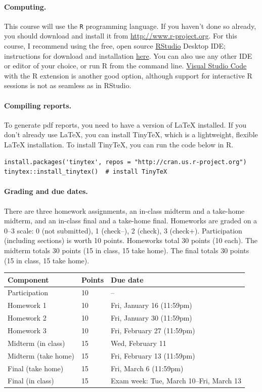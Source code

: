 \documentclass[letterpaper, 12pt, parskip=full,DIV=10]{scrartcl}
\begin{document}
\paragraph{Computing.} This course will use the \texttt{R} programming language. 
If you haven't done so already, you should download and install it from \url{http://www.r-project.org}. 
For this course, I recommend using the free, open source \href{https://rstudio.com}{RStudio} Desktop IDE; instructions for download and installation \href{https://posit.co/download/rstudio-desktop/}{here}. 
You can also use any other IDE or editor of your choice, or run R from the command line. 
\href{https://code.visualstudio.com/}{Visual Studio Code} with the R extension is another good option, although support for interactive R sessions is not as seamless as in RStudio. 

\paragraph{Compiling reports.} To generate pdf reports, you need to have a version of LaTeX installed. If you don't already use LaTeX, you can install TinyTeX, which is a lightweight, flexible LaTeX installation.
To install TinyTeX, you can run the code below in R.
\begin{verbatim}
install.packages('tinytex', repos = "http://cran.us.r-project.org")
tinytex::install_tinytex()  # install TinyTeX
\end{verbatim}

\paragraph{Grading and due dates.} There are three homework assignments, an in-class midterm and a take-home midterm, and an in-class final and a take-home final. 
Homeworks are graded on a 0--3 scale: 0 (not submitted), 1 (check--), 2 (check), 3 (check+). Participation (including sections) is worth 10 points. 
Homeworks total 30 points (10 each). 
The midterm totals 30 points (15 in class, 15 take home). 
The final totals 30 points (15 in class, 15 take home).

\begin{center}
\begin{tabular}{l l l}
\textbf{Component} & \textbf{Points} & \textbf{Due date} \\
\hline
Participation & 10 & -- \\
Homework 1 & 10 & Fri, January 16 (11:59pm) \\
Homework 2 & 10 & Fri, January 30 (11:59pm) \\
Homework 3 & 10 & Fri, February 27 (11:59pm) \\
Midterm (in class) & 15 & Wed, February 11 \\
Midterm (take home) & 15 & Fri, February 13 (11:59pm) \\
Final (take home) & 15 & Fri, March 6 (11:59pm) \\
Final (in class) & 15 & Exam week: Tue, March 10--Fri, March 13 \\
\end{tabular}
\end{center}
\end{document}

